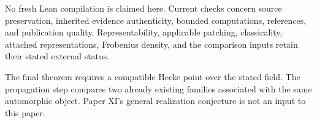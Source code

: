No fresh Lean compilation is claimed here. Current checks concern source preservation, inherited evidence authenticity, bounded computations, references, and publication quality. Representability, applicable patching, classicality, attached representations, Frobenius density, and the comparison inputs retain their stated external status.

The final theorem requires a compatible Hecke point over the stated field. The propagation step compares two already existing families associated with the same automorphic object. Paper XI's general realization conjecture is not an input to this paper.
\clearpage
{\setlength{\parskip}{0pt}\tableofcontents}
\clearpage
